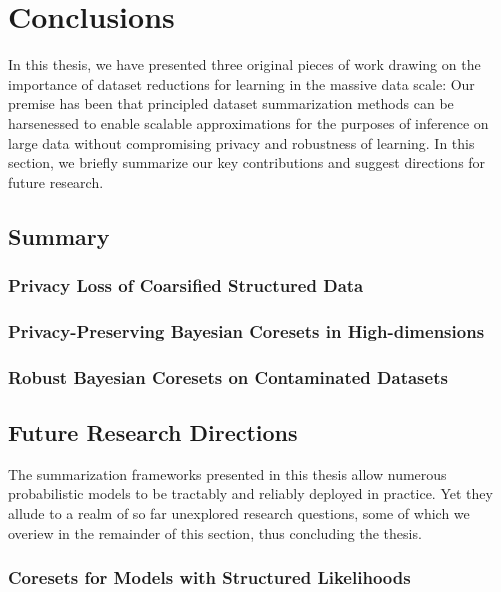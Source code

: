 \chapter{Conclusions}
\label{chap:chap6}
\renewcommand*{\MyPath}{../Chapter6}%
\newcommand{\etal}{\textit{et al}.}
\newcommand{\ie}{\textit{i}.\textit{e}.}

In this thesis, we have presented three original pieces of work drawing on the importance of dataset reductions for learning in the massive data scale: Our premise has been that principled dataset summarization methods can be harsenessed to enable scalable approximations for the purposes of inference on large data without compromising privacy and robustness of learning.
In this section, we briefly summarize our key contributions and suggest directions for future research.

\section{Summary}
\label{sec:summary}

\subsection{Privacy Loss of Coarsified Structured Data}
\label{subsec:ch3-summary}


\subsection{Privacy-Preserving Bayesian Coresets in High-dimensions}
\label{subsec:ch4-summary}

\subsection{Robust Bayesian Coresets on Contaminated Datasets}
\label{subsec:ch4-summary}


\section{Future Research Directions}
\label{sec:future-research-directions}
The summarization frameworks presented in this thesis allow numerous probabilistic models to be tractably and reliably deployed in practice. Yet they allude to a realm of so far unexplored research questions, some of which we overiew in the remainder of this section, thus concluding the thesis.

\subsection{Coresets for Models with Structured Likelihoods}
\label{subsec:structure-liks}

